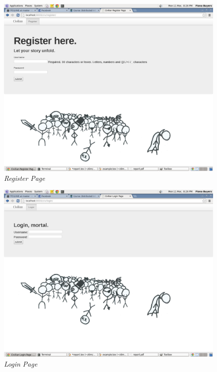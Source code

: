 \documentclass{sig-alt-release2}
\begin{document}
\begin{figure}[!htbp]
  \caption{\textit{Register Page}}
  \begin{center}
		\includegraphics[scale=0.15]{img/register.png}
  \end{center}
\end{figure}

\begin{figure}[!htbp]
  \caption{\textit{Login Page}}
  \begin{center}
		\includegraphics[scale=0.15]{img/login.png}
  \end{center}
\end{figure}
\end{document}
